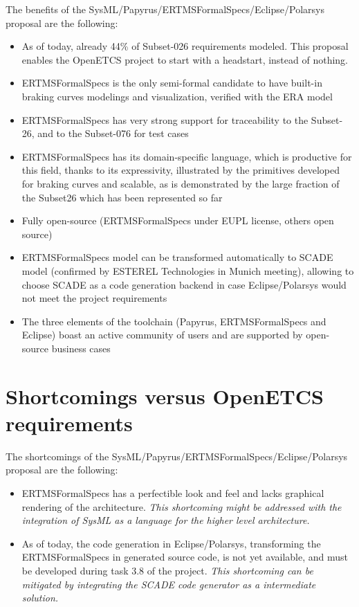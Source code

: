 The benefits of the SysML/Papyrus/ERTMSFormalSpecs/Eclipse/Polarsys proposal are the following:

\begin{itemize}
	\item As of today, already 44\% of Subset-026 requirements modeled. This proposal enables the OpenETCS project to start with a headstart, instead of nothing.
	\item ERTMSFormalSpecs is the only semi-formal candidate to have built-in braking curves modelings and visualization, verified with the ERA model
	\item ERTMSFormalSpecs has very strong support for traceability to the Subset-26, and to the Subset-076 for test cases
	\item ERTMSFormalSpecs has its domain-specific language, which is productive for this field, thanks to its expressivity, illustrated by the primitives
developed for braking curves and scalable, as is demonstrated by the large fraction of the Subset26 which has been represented so far
	\item Fully open-source (ERTMSFormalSpecs under EUPL license, others open source)
	\item ERTMSFormalSpecs model can be transformed automatically to SCADE model (confirmed by ESTEREL Technologies in Munich meeting), allowing to choose SCADE as a code generation backend in case Eclipse/Polarsys would not meet the project requirements
	\item The three elements of the toolchain (Papyrus, ERTMSFormalSpecs and Eclipse) boast an active community of users and are supported by open-source business cases
\end{itemize}

\section{Shortcomings versus OpenETCS requirements}

The shortcomings of the SysML/Papyrus/ERTMSFormalSpecs/Eclipse/Polarsys proposal are the following:

\begin{itemize}
	\item ERTMSFormalSpecs has a perfectible look and feel and lacks graphical rendering of the architecture. \emph{This shortcoming might be addressed with the integration of SysML as a language for the higher level architecture.}
	\item As of today, the code generation in Eclipse/Polarsys, transforming the ERTMSFormalSpecs in generated source code, is not yet available, and must be developed during task 3.8 of the project. \emph{This shortcoming can be mitigated by integrating the SCADE code generator as a intermediate solution.}
\end{itemize}

